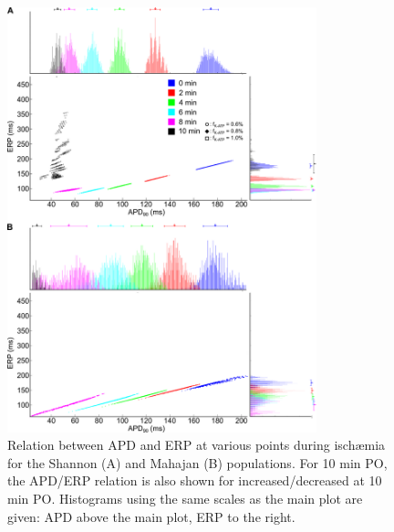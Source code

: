 \documentclass[../thesis-main.tex]{subfiles}
\begin{document}
\begin{figure}
 \centering
 \includegraphics[width=0.8\textwidth]{isch17-apd90_erp-fkatpVar}
 \caption[Relation between APD and ERP during isch\ae{}mia.]{Relation between APD and ERP at various points during isch\ae{}mia for the Shannon (A) and Mahajan (B) populations. For 10 min PO, the APD/ERP relation is also shown for increased/decreased \fkatp{} at 10 min PO. Histograms using the same scales as the main plot are given: APD above the main plot, ERP to the right.}
 \label{fig:isch17-apd90_erp-fkatpVar}
\end{figure}
\end{document}
